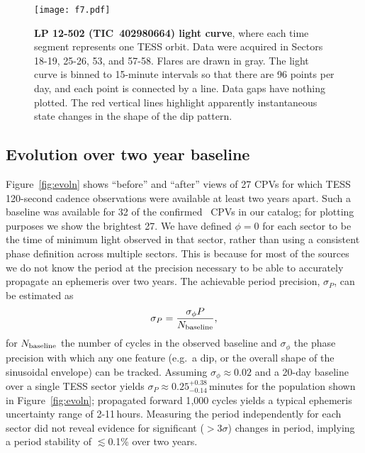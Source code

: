 \documentclass[11pt,twocolumn,tighten]{aastex63}
\begin{document}
\begin{figure*}[!tp]
	\begin{center}
		\centering
		\texttt{[image: f7.pdf]}
		\vspace{-0.3cm}
		\caption{
      {\bf LP 12-502 (TIC~402980664) light curve}, where each time
      segment represents one TESS orbit.  Data were acquired in
      Sectors 18-19, 25-26, 53, and 57-58.  Flares are drawn in gray.
      The light curve is binned to 15-minute intervals so that there
      are 96 points per day, and each point is connected by a line.
      Data gaps have nothing plotted.  The red vertical lines
      highlight apparently instantaneous state changes in the shape of
      the dip pattern.  
		}
		\label{fig:lplc}
	\end{center}
\end{figure*}


\subsection{Evolution over two year baseline}
\label{subsec:twoyear}

Figure~\ref{fig:evoln} shows ``before'' and ``after'' views of 27 CPVs
for which TESS 120-second cadence observations were available at least
two years apart.  Such a baseline was available for 32 of the
confirmed \ngoods\ CPVs in our catalog; for plotting purposes we show
the brightest 27.  
We have defined $\phi=0$ for each sector to be the time of minimum
light observed in that sector, rather than using a consistent phase
definition across multiple sectors.
This is because for most of the sources we do not know the period at the
precision necessary to be able to accurately propagate an ephemeris
over two years.  The achievable period precision, $\sigma_P$, can be
estimated as
\begin{equation}
  \sigma_{P} = \frac { \sigma_{\phi} P } { N_{\rm baseline} },
  \label{eq:periodprecision}
\end{equation}
for $N_{\rm baseline}$ the number of cycles in the observed baseline
and $\sigma_{\phi}$ the phase precision with which any one feature
(e.g.~a dip, or the overall shape of the sinusoidal envelope) can be
tracked.  Assuming $\sigma_\phi$$\approx$$0.02$ and a 20-day baseline
over a single TESS sector yields
$\sigma_{P}$$\approx$$0.25^{+0.38}_{-0.14}$\,minutes for the
population shown in Figure~\ref{fig:evoln}; propagated forward 1{,}000
cycles yields a typical ephemeris uncertainty range of 2-11\,hours.
Measuring the period independently for each sector did not reveal
evidence for significant ($>$3$\sigma$) changes in period, implying
a period stability of $\lesssim$0.1\% over two years.
\end{document}
